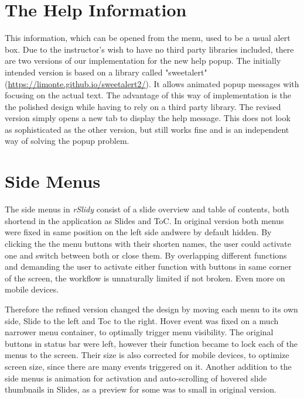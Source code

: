 \section{The Help Information}
This information, which can be opened from the menu, used to be a usual alert 
box. Due to the instructor's wish to have no third party libraries included, 
there are two versions of our implementation for the new help popup. The 
initially intended version is based on a library called "sweetalert" 
(\url{https://limonte.github.io/sweetalert2/}). It allows animated popup 
messages with focusing on the actual text. The advantage of this way of 
implementation is the the polished design while having to rely on a third party 
library. The revised version simply opens a new tab to display the help 
message. This does not look as sophisticated as the other version, but still 
works fine and is an independent way of solving the popup problem.


\section{Side Menus} %
\label{sec:side_menus}

The side menus in \textit{rSlidy} consist of a slide overview and table of 
contents, both shortend in the application as Slides and ToC. In original 
version both menus were fixed in same position on the left side andwere by 
default hidden. By clicking the the menu buttons with their shorten names, the 
user could activate one and switch between both or close them. By overlapping 
different functions and demanding the user to activate either function with 
buttons in same corner of the screen, the workflow is unnaturally limited if 
not broken. Even more on mobile devices.

Therefore the refined version changed the design by moving each menu to its own 
side, Slide to the left and Toc to the right. Hover event was fixed on a much 
narrower menu container, to optimally trigger menu visibility. The original 
buttons in status bar were left, however their function became to lock each of 
the menus to the screen. Their size is also corrected for mobile devices, to 
optimize screen size, since there are many events triggered on it. Another 
addition to the side menus is animation for activation and auto-scrolling of 
hovered slide thumbnails in Slides, as a preview for some was to small in 
original version.


